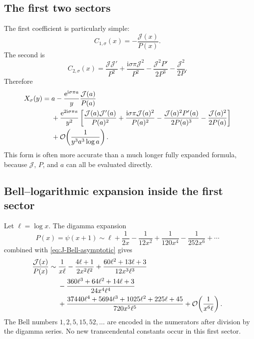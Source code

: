 \documentclass[11pt,a4paper]{article}
\numberwithin{equation}{section}
\theoremstyle{definition}
\theoremstyle{remark}
\newcommand{\e}{\mathrm e}
\newcommand{\ii}{\mathrm i}
\newcommand{\Ord}{\mathcal O}
\newcommand{\Tail}{\mathcal J}
\begin{document}
\subsection{The first two sectors}

The first coefficient is particularly simple:
\begin{equation}\label{eq:C1-exact}
 C_{1,\sigma}(x)=-\frac{\Tail(x)}{P(x)}.
\end{equation}
The second is
\begin{equation}\label{eq:C2-exact}
 C_{2,\sigma}(x)=
 \frac{\Tail\Tail'}{P^2}
 +\frac{\ii\sigma\pi\Tail^2}{P^2}
 -\frac{\Tail^2P'}{2P^3}
 -\frac{\Tail^2}{2P}.
\end{equation}
Therefore
\begin{align}
X_\sigma(y)={}&a
 -\frac{\e^{\ii\sigma\pi a}}{y}\frac{\Tail(a)}{P(a)}\notag\\
&+\frac{\e^{2\ii\sigma\pi a}}{y^2}
 \left[
 \frac{\Tail(a)\Tail'(a)}{P(a)^2}
 +\frac{\ii\sigma\pi\Tail(a)^2}{P(a)^2}
 -\frac{\Tail(a)^2P'(a)}{2P(a)^3}
 -\frac{\Tail(a)^2}{2P(a)}
 \right]\notag\\
&+\Ord\!\left(\frac1{y^3a^3\log a}\right).
\label{eq:two-sector-exact}
\end{align}
This form is often more accurate than a much longer fully expanded formula,
because $\Tail$, $P$, and $a$ can all be evaluated directly.

\subsection{Bell--logarithmic expansion inside the first sector}

Let $\ell=\log x$.  The digamma expansion
\begin{equation}\label{eq:P-expansion}
 P(x)=\psi(x+1)
 \sim \ell+\frac1{2x}-\frac1{12x^2}
 +\frac1{120x^4}-\frac1{252x^6}+\cdots
\end{equation}
combined with \eqref{eq:J-Bell-asymptotic} gives
\begin{align}
 \frac{\Tail(x)}{P(x)}\sim{}&
 \frac1{x\ell}
 -\frac{4\ell+1}{2x^2\ell^2}
 +\frac{60\ell^2+13\ell+3}{12x^3\ell^3}\notag\\
&-\frac{360\ell^3+64\ell^2+14\ell+3}{24x^4\ell^4}\notag\\
&+\frac{37440\ell^4+5694\ell^3+1025\ell^2+225\ell+45}
 {720x^5\ell^5}
 +\Ord\!\left(\frac1{x^6\ell}\right).
\label{eq:J-over-P}
\end{align}
The Bell numbers $1,2,5,15,52,\ldots$ are encoded in the numerators after
division by the digamma series.  No new transcendental constants occur in
this first sector.
\end{document}
